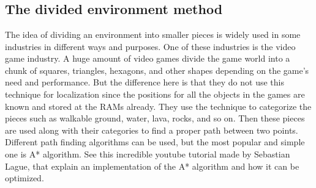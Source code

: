 \appendix %

\chapter{}
\section{The divided environment method}

The idea of dividing an environment into smaller pieces is widely used in
some industries in different ways and purposes. One of these industries is the video game industry. A huge amount of video games divide the game world
into a chunk of squares, triangles, hexagons, and other shapes depending on the
game’s need and performance. But the difference here is that they do not use
this technique for localization since the positions for all the objects in the games
are known and stored at the RAMs already. They use the technique to categorize
the pieces such as walkable ground, water, lava, rocks, and so on. Then these
pieces are used along with their categories to find a proper path between two
points. Different path finding algorithms can be used, but the most popular and
simple one is A* algorithm. See this \cite{SebastianLague_AStar} incredible youtube tutorial made by
Sebastian Lague, that explain an implementation of the A* algorithm and how
it can be optimized.